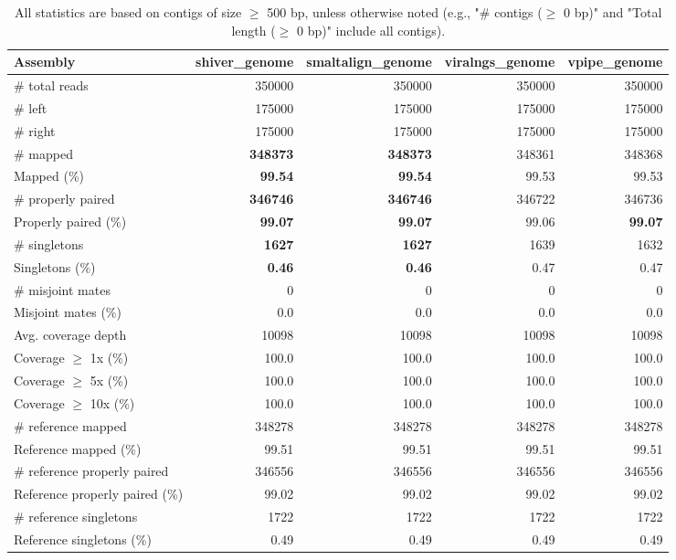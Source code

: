 \documentclass[12pt,a4paper]{article}
\begin{document}
\begin{table}[ht]
\begin{center}
\caption{All statistics are based on contigs of size $\geq$ 500 bp, unless otherwise noted (e.g., "\# contigs ($\geq$ 0 bp)" and "Total length ($\geq$ 0 bp)" include all contigs).}
\begin{tabular}{|l*{4}{|r}|}
\hline
Assembly & shiver\_genome & smaltalign\_genome & viralngs\_genome & vpipe\_genome \\ \hline
\# total reads & 350000 & 350000 & 350000 & 350000 \\ \hline
\# left & 175000 & 175000 & 175000 & 175000 \\ \hline
\# right & 175000 & 175000 & 175000 & 175000 \\ \hline
\# mapped & {\bf 348373} & {\bf 348373} & 348361 & 348368 \\ \hline
Mapped (\%) & {\bf 99.54} & {\bf 99.54} & 99.53 & 99.53 \\ \hline
\# properly paired & {\bf 346746} & {\bf 346746} & 346722 & 346736 \\ \hline
Properly paired (\%) & {\bf 99.07} & {\bf 99.07} & 99.06 & {\bf 99.07} \\ \hline
\# singletons & {\bf 1627} & {\bf 1627} & 1639 & 1632 \\ \hline
Singletons (\%) & {\bf 0.46} & {\bf 0.46} & 0.47 & 0.47 \\ \hline
\# misjoint mates & 0 & 0 & 0 & 0 \\ \hline
Misjoint mates (\%) & 0.0 & 0.0 & 0.0 & 0.0 \\ \hline
Avg. coverage depth & 10098 & 10098 & 10098 & 10098 \\ \hline
Coverage $\geq$ 1x (\%) & 100.0 & 100.0 & 100.0 & 100.0 \\ \hline
Coverage $\geq$ 5x (\%) & 100.0 & 100.0 & 100.0 & 100.0 \\ \hline
Coverage $\geq$ 10x (\%) & 100.0 & 100.0 & 100.0 & 100.0 \\ \hline
\# reference mapped & 348278 & 348278 & 348278 & 348278 \\ \hline
Reference mapped (\%) & 99.51 & 99.51 & 99.51 & 99.51 \\ \hline
\# reference properly paired & 346556 & 346556 & 346556 & 346556 \\ \hline
Reference properly paired (\%) & 99.02 & 99.02 & 99.02 & 99.02 \\ \hline
\# reference singletons & 1722 & 1722 & 1722 & 1722 \\ \hline
Reference singletons (\%) & 0.49 & 0.49 & 0.49 & 0.49 \\ \hline

\end{tabular}
\end{center}
\end{table}
\end{document}
